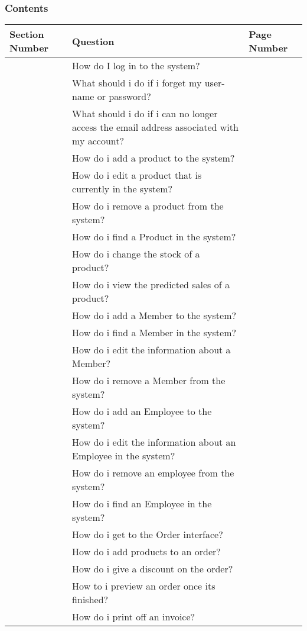 \pagebreak
\subsubsection{Contents}

\begin{center}
    \begin{longtable}{|p{3cm}|p{6cm}|p{3cm}|}
        \hline
	 \textbf{Section Number} & \textbf{Question} & \textbf{Page Number} \\ \hline
	&How do I log in to the system? & \\ \hline
	&What should i do if i forget my user-name or password?& \\ \hline
	& What should i do if i can no longer access the email address associated with my account? & \\ \hline
	&How do i add a product to the system? & \\ \hline
	&How do i edit a product that is currently in the system?& \\ \hline
	&How do i remove a product from the system?& \\ \hline
	&How do i find a Product in the system?& \\ \hline
	&How do i change the stock of a product?& \\ \hline
	&How do i view the predicted sales of a product?& \\ \hline
	&How do i add a Member to the system?& \\ \hline
	&How do i find a Member in the system?& \\ \hline
	&How do i edit the information about a Member?& \\ \hline
	&How do i remove a Member from the system?& \\ \hline
	&How do i add an Employee to the system?& \\ \hline
	&How do i edit the information about an Employee in the system?& \\ \hline
	&How do i remove an employee from the system?& \\ \hline
	&How do i find an Employee in the system?& \\ \hline
	&How do i get to the Order interface?& \\ \hline
	&How do i add products to an order?& \\ \hline
	&How do i give a discount on the order? & \\ \hline
	&How to i preview an order once its finished?& \\ \hline
	&How do i print off an invoice?& \\ \hline

\end{longtable}
\end{center}

